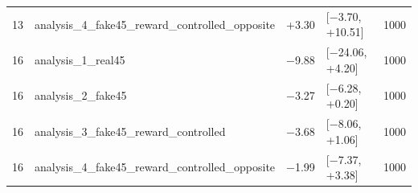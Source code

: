 \begin{table}[htbp]
\begin{tabular}{rlrlr}
    13 & analysis\_4\_fake45\_reward\_controlled\_opposite & +3.30 & [−3.70, +10.51] & 1000 \\
    16 & analysis\_1\_real45 & −9.88 & [−24.06, +4.20] & 1000 \\
    16 & analysis\_2\_fake45 & −3.27 & [−6.28, +0.20] & 1000 \\
    16 & analysis\_3\_fake45\_reward\_controlled & −3.68 & [−8.06, +1.06] & 1000 \\
    16 & analysis\_4\_fake45\_reward\_controlled\_opposite & −1.99 & [−7.37, +3.38] & 1000 \\
    \bottomrule
  \end{tabular}
\end{table}
